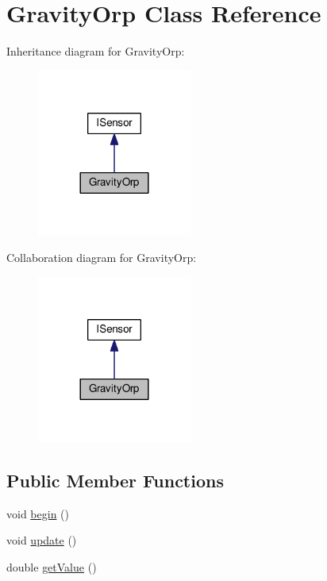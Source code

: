 \hypertarget{class_gravity_orp}{}\section{Gravity\+Orp Class Reference}
\label{class_gravity_orp}


Inheritance diagram for Gravity\+Orp\+:\nopagebreak
\begin{figure}[H]
\begin{center}
\leavevmode
\includegraphics[width=144pt]{class_gravity_orp__inherit__graph}
\end{center}
\end{figure}


Collaboration diagram for Gravity\+Orp\+:\nopagebreak
\begin{figure}[H]
\begin{center}
\leavevmode
\includegraphics[width=144pt]{class_gravity_orp__coll__graph}
\end{center}
\end{figure}
\subsection*{Public Member Functions}
\begin{DoxyCompactItemize}
\item 
void \hyperlink{class_gravity_orp_a03543b2abbe0be53f2dfb799b22b3aef}{begin} ()
\item 
void \hyperlink{class_gravity_orp_aa39d1bf33bcf7f4f415fd51d8129d15a}{update} ()
\item 
double \hyperlink{class_gravity_orp_a2b4da109c95a3415fc70b9523bd13700}{get\+Value} ()
\end{DoxyCompactItemize}
